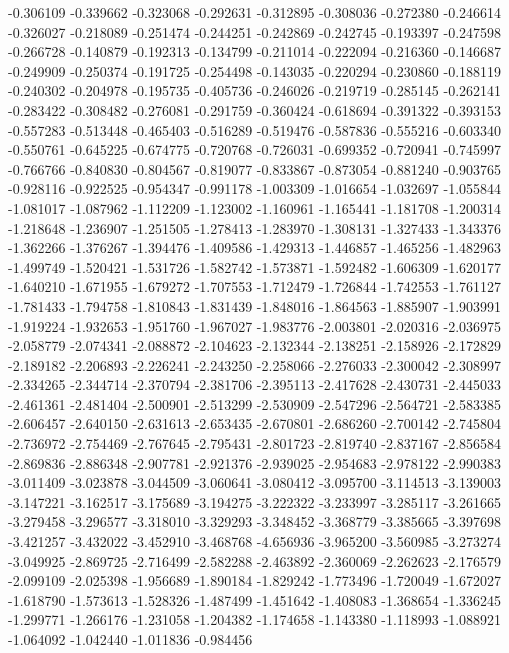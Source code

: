 -0.306109
-0.339662
-0.323068
-0.292631
-0.312895
-0.308036
-0.272380
-0.246614
-0.326027
-0.218089
-0.251474
-0.244251
-0.242869
-0.242745
-0.193397
-0.247598
-0.266728
-0.140879
-0.192313
-0.134799
-0.211014
-0.222094
-0.216360
-0.146687
-0.249909
-0.250374
-0.191725
-0.254498
-0.143035
-0.220294
-0.230860
-0.188119
-0.240302
-0.204978
-0.195735
-0.405736
-0.246026
-0.219719
-0.285145
-0.262141
-0.283422
-0.308482
-0.276081
-0.291759
-0.360424
-0.618694
-0.391322
-0.393153
-0.557283
-0.513448
-0.465403
-0.516289
-0.519476
-0.587836
-0.555216
-0.603340
-0.550761
-0.645225
-0.674775
-0.720768
-0.726031
-0.699352
-0.720941
-0.745997
-0.766766
-0.840830
-0.804567
-0.819077
-0.833867
-0.873054
-0.881240
-0.903765
-0.928116
-0.922525
-0.954347
-0.991178
-1.003309
-1.016654
-1.032697
-1.055844
-1.081017
-1.087962
-1.112209
-1.123002
-1.160961
-1.165441
-1.181708
-1.200314
-1.218648
-1.236907
-1.251505
-1.278413
-1.283970
-1.308131
-1.327433
-1.343376
-1.362266
-1.376267
-1.394476
-1.409586
-1.429313
-1.446857
-1.465256
-1.482963
-1.499749
-1.520421
-1.531726
-1.582742
-1.573871
-1.592482
-1.606309
-1.620177
-1.640210
-1.671955
-1.679272
-1.707553
-1.712479
-1.726844
-1.742553
-1.761127
-1.781433
-1.794758
-1.810843
-1.831439
-1.848016
-1.864563
-1.885907
-1.903991
-1.919224
-1.932653
-1.951760
-1.967027
-1.983776
-2.003801
-2.020316
-2.036975
-2.058779
-2.074341
-2.088872
-2.104623
-2.132344
-2.138251
-2.158926
-2.172829
-2.189182
-2.206893
-2.226241
-2.243250
-2.258066
-2.276033
-2.300042
-2.308997
-2.334265
-2.344714
-2.370794
-2.381706
-2.395113
-2.417628
-2.430731
-2.445033
-2.461361
-2.481404
-2.500901
-2.513299
-2.530909
-2.547296
-2.564721
-2.583385
-2.606457
-2.640150
-2.631613
-2.653435
-2.670801
-2.686260
-2.700142
-2.745804
-2.736972
-2.754469
-2.767645
-2.795431
-2.801723
-2.819740
-2.837167
-2.856584
-2.869836
-2.886348
-2.907781
-2.921376
-2.939025
-2.954683
-2.978122
-2.990383
-3.011409
-3.023878
-3.044509
-3.060641
-3.080412
-3.095700
-3.114513
-3.139003
-3.147221
-3.162517
-3.175689
-3.194275
-3.222322
-3.233997
-3.285117
-3.261665
-3.279458
-3.296577
-3.318010
-3.329293
-3.348452
-3.368779
-3.385665
-3.397698
-3.421257
-3.432022
-3.452910
-3.468768
-4.656936
-3.965200
-3.560985
-3.273274
-3.049925
-2.869725
-2.716499
-2.582288
-2.463892
-2.360069
-2.262623
-2.176579
-2.099109
-2.025398
-1.956689
-1.890184
-1.829242
-1.773496
-1.720049
-1.672027
-1.618790
-1.573613
-1.528326
-1.487499
-1.451642
-1.408083
-1.368654
-1.336245
-1.299771
-1.266176
-1.231058
-1.204382
-1.174658
-1.143380
-1.118993
-1.088921
-1.064092
-1.042440
-1.011836
-0.984456
